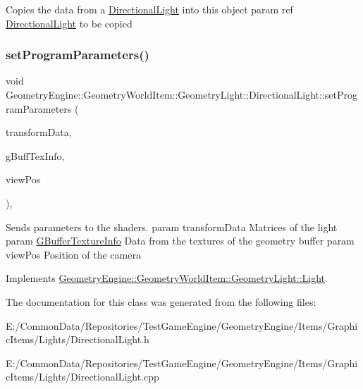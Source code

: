 Copies the data from a \mbox{\hyperlink{class_geometry_engine_1_1_geometry_world_item_1_1_geometry_light_1_1_directional_light}{Directional\+Light}} into this object param ref \mbox{\hyperlink{class_geometry_engine_1_1_geometry_world_item_1_1_geometry_light_1_1_directional_light}{Directional\+Light}} to be copied \mbox{\label{class_geometry_engine_1_1_geometry_world_item_1_1_geometry_light_1_1_directional_light_ae395d609ee47dd5d399514bb2c76d2db}} 
\subsubsection{\texorpdfstring{setProgramParameters()}{setProgramParameters()}}
{\footnotesize\ttfamily void Geometry\+Engine\+::\+Geometry\+World\+Item\+::\+Geometry\+Light\+::\+Directional\+Light\+::set\+Program\+Parameters (\begin{DoxyParamCaption}\item[{const \mbox{\hyperlink{class_geometry_engine_1_1_lighting_transformation_data}{Lighting\+Transformation\+Data}} \&}]{transform\+Data,  }\item[{const \mbox{\hyperlink{class_geometry_engine_1_1_g_buffer_texture_info}{G\+Buffer\+Texture\+Info}} \&}]{g\+Buff\+Tex\+Info,  }\item[{const Q\+Vector3D \&}]{view\+Pos }\end{DoxyParamCaption})\hspace{0.3cm}{\ttfamily [protected]}, {\ttfamily [virtual]}}

Sends parameters to the shaders. param transform\+Data Matrices of the light param \mbox{\hyperlink{class_geometry_engine_1_1_g_buffer_texture_info}{G\+Buffer\+Texture\+Info}} Data from the textures of the geometry buffer param view\+Pos Position of the camera 

Implements \mbox{\hyperlink{class_geometry_engine_1_1_geometry_world_item_1_1_geometry_light_1_1_light_a366be5945389fe58df4bf5aa8c43138f}{Geometry\+Engine\+::\+Geometry\+World\+Item\+::\+Geometry\+Light\+::\+Light}}.



The documentation for this class was generated from the following files\+:\begin{DoxyCompactItemize}
\item 
E\+:/\+Common\+Data/\+Repositories/\+Test\+Game\+Engine/\+Geometry\+Engine/\+Items/\+Graphic\+Items/\+Lights/Directional\+Light.\+h\item 
E\+:/\+Common\+Data/\+Repositories/\+Test\+Game\+Engine/\+Geometry\+Engine/\+Items/\+Graphic\+Items/\+Lights/Directional\+Light.\+cpp\end{DoxyCompactItemize}
